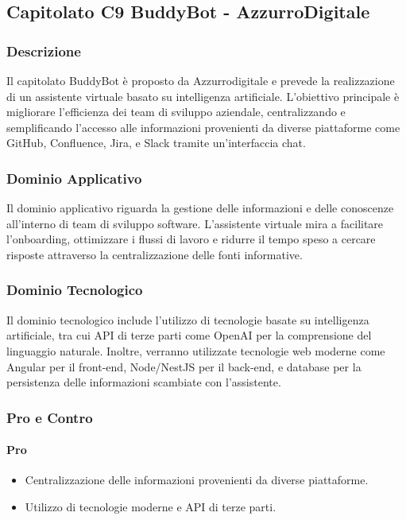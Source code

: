 \documentclass{article}
\begin{document}
\subsection{Capitolato C9 BuddyBot - AzzurroDigitale}

\subsubsection{Descrizione}
Il capitolato BuddyBot è proposto da Azzurrodigitale e prevede la realizzazione 
di un assistente virtuale basato su intelligenza artificiale. 
L'obiettivo principale è migliorare l'efficienza dei team di sviluppo aziendale, 
centralizzando e semplificando l'accesso alle informazioni provenienti da diverse piattaforme come GitHub, 
Confluence, Jira, e Slack tramite un'interfaccia chat.

\subsubsection{Dominio Applicativo}
Il dominio applicativo riguarda la gestione delle informazioni e 
delle conoscenze all'interno di team di sviluppo software. 
L'assistente virtuale mira a facilitare l'onboarding, ottimizzare i flussi di lavoro e ridurre 
il tempo speso a cercare risposte attraverso la centralizzazione delle fonti informative.

\subsubsection{Dominio Tecnologico}
Il dominio tecnologico include l'utilizzo di tecnologie basate su intelligenza artificiale, 
tra cui API di terze parti come OpenAI per la comprensione del linguaggio naturale. 
Inoltre, verranno utilizzate tecnologie web moderne come Angular per il front-end, 
Node/NestJS per il back-end, e database per la persistenza delle informazioni scambiate con l'assistente.

\subsubsection{Pro e Contro}

\paragraph{Pro}
\begin{itemize}
    \item Centralizzazione delle informazioni provenienti da diverse piattaforme.
    \item Utilizzo di tecnologie moderne e API di terze parti.
\end{itemize}
\end{document}
